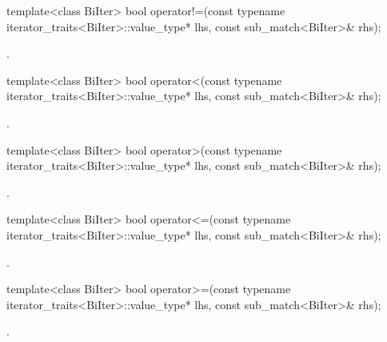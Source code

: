 %
\begin{itemdecl}
template<class BiIter>
  bool operator!=(const typename iterator_traits<BiIter>::value_type* lhs,
                  const sub_match<BiIter>& rhs);
\end{itemdecl}

\begin{itemdescr}
\pnum\returns {}.
\end{itemdescr}

%
\begin{itemdecl}
template<class BiIter>
  bool operator<(const typename iterator_traits<BiIter>::value_type* lhs,
                 const sub_match<BiIter>& rhs);
\end{itemdecl}

\begin{itemdescr}
\pnum\returns {}.
\end{itemdescr}

%
\begin{itemdecl}
template<class BiIter>
  bool operator>(const typename iterator_traits<BiIter>::value_type* lhs,
                 const sub_match<BiIter>& rhs);
\end{itemdecl}

\begin{itemdescr}
\pnum\returns {}.
\end{itemdescr}

%
\begin{itemdecl}
template<class BiIter>
  bool operator<=(const typename iterator_traits<BiIter>::value_type* lhs,
                  const sub_match<BiIter>& rhs);
\end{itemdecl}

\begin{itemdescr}
\pnum\returns {}.
\end{itemdescr}

%
\begin{itemdecl}
template<class BiIter>
  bool operator>=(const typename iterator_traits<BiIter>::value_type* lhs,
                  const sub_match<BiIter>& rhs);
\end{itemdecl}

\begin{itemdescr}
\pnum\returns {}.
\end{itemdescr}

